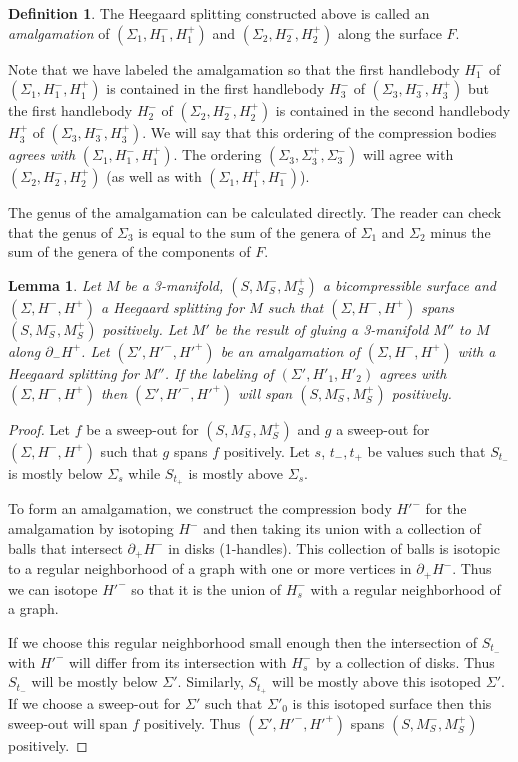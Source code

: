 \documentclass[12pt]{amsart}
\theoremstyle{plain}
\newtheorem{Lem}[Thm]{Lemma}
\theoremstyle{definition}
\newtheorem{Def}[Thm]{Definition}
\begin{document}
\begin{Def}
The Heegaard splitting constructed above is called an \textit{amalgamation} of $(\Sigma_1, H_1^-, H^+_1)$ and $(\Sigma_2, H_2^-, H^+_2)$ along the surface $F$.
\end{Def}

Note that we have labeled the amalgamation so that the first handlebody $H^-_1$ of $(\Sigma_1, H^-_1, H^+_1)$ is contained in the first handlebody $H^-_3$ of $(\Sigma_3, H^-_3, H^+_3)$  but the first handlebody $H^-_2$ of $(\Sigma_2, H^-_2, H^+_2)$ is contained in the second handlebody $H^+_3$ of $(\Sigma_3, H^-_3, H^+_3)$.  We will say that this ordering of the compression bodies \textit{agrees with} $(\Sigma_1,H^-_1, H^+_1)$.  The ordering $(\Sigma_3, \Sigma_3^+, \Sigma_3^-)$ will agree with $(\Sigma_2, H^-_2, H^+_2)$ (as well as with $(\Sigma_1, H^+_1, H^-_1)$).

The genus of the amalgamation can be calculated directly.  The reader can check that the genus of $\Sigma_3$ is equal to the sum of the genera of $\Sigma_1$ and $\Sigma_2$ minus the sum of the genera of the components of $F$.

\begin{Lem}
\label{amalgspanlem}
Let $M$ be a 3-manifold, $(S,M^-_S, M^+_S)$ a bicompressible surface and $(\Sigma, H^-, H^+)$ a Heegaard splitting for $M$ such that $(\Sigma, H^-, H^+)$ spans $(S, M_S^-, M_S^+)$ positively.  Let $M'$ be the result of gluing a 3-manifold $M''$ to $M$ along $\partial_- H^+$.  Let $(\Sigma', H'^-, H'^+)$ be an amalgamation of $(\Sigma, H^-, H^+)$ with a Heegaard splitting for $M''$.  If the labeling of $(\Sigma', H'_1, H'_2)$ agrees with $(\Sigma, H^-, H^+)$ then $(\Sigma', H'^-, H'^+)$ will span $(S, M_S^-, M_S^+)$ positively.
\end{Lem}

\begin{proof}
Let $f$ be a sweep-out for $(S, M_S^-, M_S^+)$ and $g$ a sweep-out for $(\Sigma, H^-, H^+)$ such that $g$ spans $f$ positively.  Let $s$, $t_-, t_+$ be values such that $S_{t_-}$ is mostly below $\Sigma_s$ while $S_{t_+}$ is mostly above $\Sigma_s$.

To form an amalgamation, we construct the compression body $H'^-$ for the amalgamation by isotoping $H^-$ and then taking its union with a collection of balls that intersect $\partial_+ H^-$ in disks (1-handles).  This collection of balls is isotopic to a regular neighborhood of a graph with one or more vertices in $\partial_+ H^-$.  Thus we can isotope $H'^-$ so that it is the union of $H^-_s$ with a regular neighborhood of a graph.  

If we choose this regular neighborhood small enough then the intersection of $S_{t_-}$ with $H'^-$ will differ from its intersection with $H^-_s$ by a collection of disks.  Thus $S_{t_-}$ will be mostly below $\Sigma'$.  Similarly, $S_{t_+}$ will be mostly above this isotoped $\Sigma'$.  If we choose a sweep-out for $\Sigma'$ such that $\Sigma'_0$ is this isotoped surface then this sweep-out will span $f$ positively.  Thus $(\Sigma', H'^-, H'^+)$ spans $(S, M_S^-, M_S^+)$ positively.
\end{proof}
\end{document}
